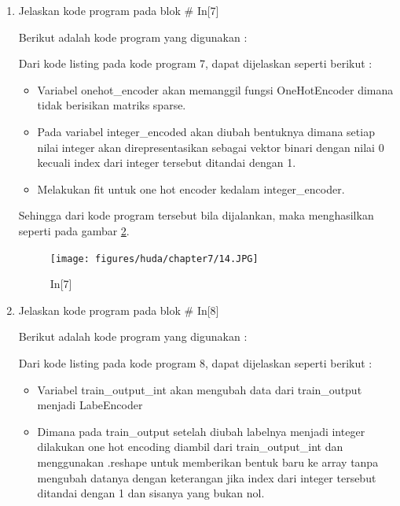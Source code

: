 \begin{enumerate}
\par Sehingga dari kode program tersebut bila dijalankan, maka menghasilkan seperti pada gambar \ref{c7_13}.
\begin{figure}[!htbp]
	\centerline{\texttt{[image: figures/huda/chapter7/13.JPG]}}
	\caption{In[6]}
	\label{c7_13}
\end{figure}
\item Jelaskan kode program pada blok \# In[7]
\par Berikut adalah kode program yang digunakan :

\par Dari kode listing pada kode program 7, dapat dijelaskan seperti berikut :
\begin{itemize}
\item Variabel onehot\_encoder akan memanggil fungsi OneHotEncoder dimana tidak berisikan matriks sparse.
\item Pada variabel integer\_encoded akan diubah bentuknya dimana setiap nilai integer akan direpresentasikan sebagai vektor binari dengan nilai 0 kecuali index dari integer tersebut ditandai dengan 1.
\item Melakukan fit untuk one hot encoder kedalam integer\_encoder.
\end{itemize}
\par Sehingga dari kode program tersebut bila dijalankan, maka menghasilkan seperti pada gambar \ref{c7_14}.
\begin{figure}[!htbp]
	\centerline{\texttt{[image: figures/huda/chapter7/14.JPG]}}
	\caption{In[7]}
	\label{c7_14}
\end{figure}
\item Jelaskan kode program pada blok \# In[8]
\par Berikut adalah kode program yang digunakan :

\par Dari kode listing pada kode program 8, dapat dijelaskan seperti berikut :
\begin{itemize}
\item Variabel train\_output\_int  akan mengubah data dari train\_output menjadi LabeEncoder
\item Dimana pada train\_output setelah diubah labelnya menjadi integer dilakukan one hot encoding diambil dari train\_output\_int dan menggunakan .reshape untuk memberikan bentuk baru ke array tanpa mengubah datanya dengan keterangan jika index dari integer tersebut ditandai dengan 1 dan sisanya yang bukan nol.

\end{itemize}
\end{enumerate}
